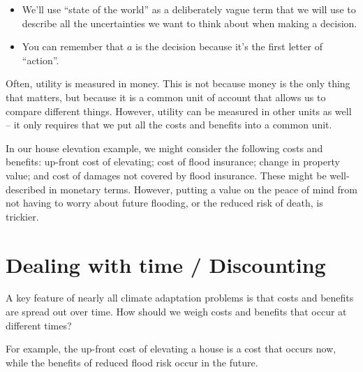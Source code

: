 \documentclass[
  letterpaper,
  DIV=11,
  numbers=noendperiod]{scrreprt}
\providecommand{\tightlist}{%
  \setlength{\itemsep}{0pt}\setlength{\parskip}{0pt}}
\begin{document}
\begin{itemize}
\tightlist
\item
  We'll use ``state of the world'' as a deliberately vague term that we
  will use to describe all the uncertainties we want to think about when
  making a decision.
\item
  You can remember that \(a\) is the decision because it's the first
  letter of ``action''.
\end{itemize}

Often, utility is measured in money. This is not because money is the
only thing that matters, but because it is a common unit of account that
allows us to compare different things. However, utility can be measured
in other units as well -- it only requires that we put all the costs and
benefits into a common unit.

\begin{tcolorbox}[enhanced jigsaw, arc=.35mm, breakable, title=\textcolor{quarto-callout-tip-color}{\faLightbulb}\hspace{0.5em}{Tip}, coltitle=black, opacityback=0, bottomtitle=1mm, colback=white, left=2mm, opacitybacktitle=0.6, toptitle=1mm, colframe=quarto-callout-tip-color-frame, leftrule=.75mm, titlerule=0mm, rightrule=.15mm, bottomrule=.15mm, colbacktitle=quarto-callout-tip-color!10!white, toprule=.15mm]

In our house elevation example, we might consider the following costs
and benefits: up-front cost of elevating; cost of flood insurance;
change in property value; and cost of damages not covered by flood
insurance. These might be well-described in monetary terms. However,
putting a value on the peace of mind from not having to worry about
future flooding, or the reduced risk of death, is trickier.

\end{tcolorbox}

\section{Dealing with time /
Discounting}\label{dealing-with-time-discounting}

A key feature of nearly all climate adaptation problems is that costs
and benefits are spread out over time. How should we weigh costs and
benefits that occur at different times?

\begin{tcolorbox}[enhanced jigsaw, arc=.35mm, breakable, title=\textcolor{quarto-callout-tip-color}{\faLightbulb}\hspace{0.5em}{Tip}, coltitle=black, opacityback=0, bottomtitle=1mm, colback=white, left=2mm, opacitybacktitle=0.6, toptitle=1mm, colframe=quarto-callout-tip-color-frame, leftrule=.75mm, titlerule=0mm, rightrule=.15mm, bottomrule=.15mm, colbacktitle=quarto-callout-tip-color!10!white, toprule=.15mm]

For example, the up-front cost of elevating a house is a cost that
occurs now, while the benefits of reduced flood risk occur in the
future.

\end{tcolorbox}
\end{document}
